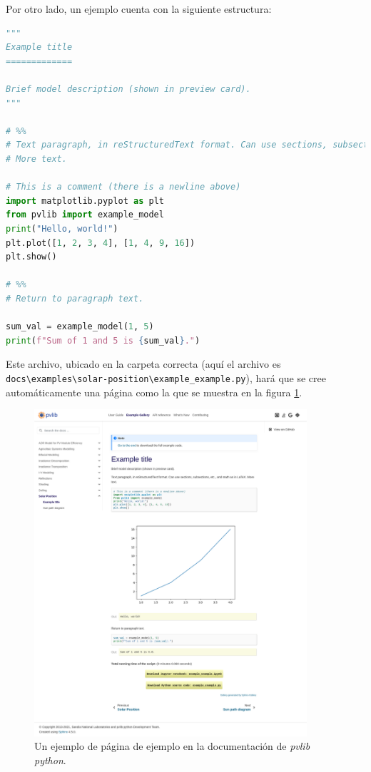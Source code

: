 Por otro lado, un ejemplo cuenta con la siguiente estructura:

\begin{lstlisting}[language=Python]
"""
Example title
=============

Brief model description (shown in preview card).
"""

# %%
# Text paragraph, in reStructuredText format. Can use sections, subsections, etc., and math as in LaTeX.
# More text.

# This is a comment (there is a newline above)
import matplotlib.pyplot as plt
from pvlib import example_model
print("Hello, world!")
plt.plot([1, 2, 3, 4], [1, 4, 9, 16])
plt.show()

# %%
# Return to paragraph text.

sum_val = example_model(1, 5)
print(f"Sum of 1 and 5 is {sum_val}.")
\end{lstlisting}

Este archivo, ubicado en la carpeta correcta (aquí el archivo es \lstinline{docs\examples\solar-position\example_example.py}), hará que se cree automáticamente una página como la que se muestra en la figura \ref{fig:doc_use_example}.

\begin{figure}[H]
    \centering
    \includegraphics[width=0.9\textwidth]{./images/doc_example/example_stretch.png}
    \caption{Un ejemplo de página de ejemplo en la documentación de \textit{pvlib python}.}
    \label{fig:doc_use_example}
\end{figure}

